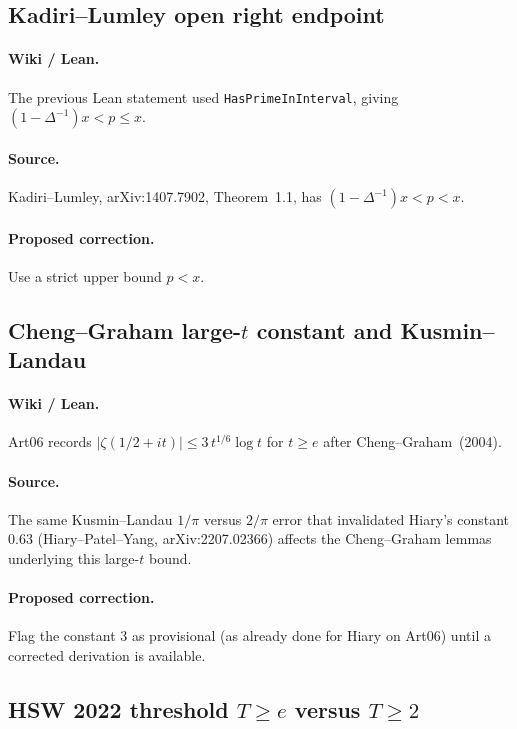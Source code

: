 \documentclass[11pt,a4paper]{article}
\begin{document}
\subsection{Kadiri--Lumley open right endpoint}
\label{err:kadiri-lumley-open}
\paragraph{Wiki / Lean.}
The previous Lean statement used \texttt{HasPrimeInInterval}, giving
$(1-\Delta^{-1})x < p \le x$.
\paragraph{Source.}
Kadiri--Lumley, arXiv:1407.7902, Theorem~1.1, has
$(1-\Delta^{-1})x < p < x$.
\paragraph{Proposed correction.}
Use a strict upper bound $p<x$.

\subsection{Cheng--Graham large-$t$ constant and Kusmin--Landau}
\label{err:cheng-graham-kusmin}
\paragraph{Wiki / Lean.}
Art06 records $|\zeta(1/2+it)|\le 3\,t^{1/6}\log t$ for $t\ge e$ after
Cheng--Graham~(2004).
\paragraph{Source.}
The same Kusmin--Landau $1/\pi$ versus $2/\pi$ error that invalidated
Hiary's constant $0.63$ (Hiary--Patel--Yang, arXiv:2207.02366) affects the
Cheng--Graham lemmas underlying this large-$t$ bound.
\paragraph{Proposed correction.}
Flag the constant $3$ as provisional (as already done for Hiary on Art06)
until a corrected derivation is available.

\subsection{\texorpdfstring{HSW 2022 threshold $T\ge e$ versus $T\ge 2$}{HSW 2022 threshold T>=e versus T>=2}}
\label{err:hsw-threshold}
\end{document}
